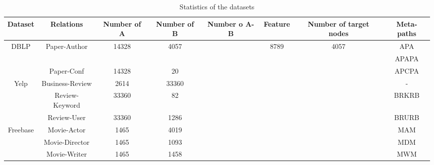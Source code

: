 \begin{table*}[!htbp]
\centering
\caption{Statistics of the datasets}
\label{tab:dataset}
\begin{tabular}{|c|c|c|c|c|c|c|c|}
\hline
Dataset                   & Relations                     & Number of A            & Number of B           & Number o A-B      & Feature               & Number of target nodes & Meta-paths \\ \hline
\multirow{3}{*}{DBLP}     & \multirow{2}{*}{Paper-Author} & \multirow{2}{*}{14328} & \multirow{2}{*}{4057} & \multirow{2}{*}{} & \multirow{3}{*}{8789} & \multirow{3}{*}{4057}  & APA        \\ \cline{8-8} 
                          &                               &                        &                       &                   &                       &                        & APAPA      \\ \cline{2-5} \cline{8-8} 
                          & Paper-Conf                    & 14328                  & 20                    &                   &                       &                        & APCPA      \\ \hline
\multirow{3}{*}{Yelp}     & Business-Review               & 2614                   & 33360                 &                   & \multirow{3}{*}{}     & \multirow{3}{*}{}      & -          \\ \cline{2-5} \cline{8-8} 
                          & Review-Keyword                &  33360                 &  82                   &                   &                       &                        & BRKRB      \\ \cline{2-5} \cline{8-8} 
                          & Review-User                   &  33360                 &  1286                 &                   &                       &                        & BRURB      \\ \hline
\multirow{3}{*}{Freebase} & Movie-Actor                   & 1465                    &  4019                 &                   & \multirow{3}{*}{}     & \multirow{3}{*}{}      & MAM        \\ \cline{2-5} \cline{8-8} 
                          & Movie-Director                & 1465                   &  1093                  &                   &                       &                        & MDM        \\ \cline{2-5} \cline{8-8} 
                          & Movie-Writer                  & 1465                   &  1458                 &                   &                       &                        & MWM        \\ \hline
\end{tabular}
\end{table*}

